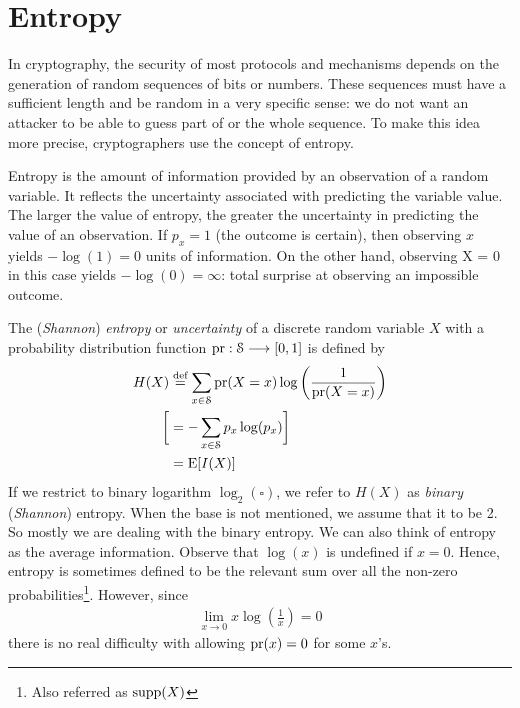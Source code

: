 \documentclass[a4paper, 12pt]{book} %
\begin{document}
\section{Entropy}

In cryptography, the security of most protocols and mechanisms depends on the generation of random sequences of bits or numbers. These sequences must have a sufficient length and be random in a very specific sense: we do not want an attacker to be able to guess part of or the whole sequence. To make this idea more precise, cryptographers use the concept of entropy.

Entropy is the amount of information provided by an observation of a random variable. It reflects the uncertainty associated with predicting the variable value. The larger the value of entropy, the greater the uncertainty in predicting the value of an observation. If $p_x = 1$ (the outcome is certain), then observing $x$ yields $-\log(1) = 0$ units of information. On the other hand, observing X = 0 in this case yields $-\log(0) = \infty$: total surprise at observing an impossible outcome.

\begin{definition}
    The (\emph{Shannon}) \emph{entropy} or \emph{uncertainty} of a discrete random variable $X$ with a probability distribution function $\operatorname{pr}: \EuScript{S} \longrightarrow [0,1]$ is defined by
    \begin{align}
        H(X) &\overset{\text{def}}{=} \sum_{x \in \EuScript{S}} \operatorname{pr}(X = x) \log\left( \frac{1}{\operatorname{pr}(X = x)} \right)  \\
        \bigg[&= - \sum_{x \in \EuScript{S}} p_x \log(p_x) \bigg]\\
        &= \mathrm{E}[I(X)] 
    \end{align}
    If we restrict to binary logarithm $\log_2(\square)$, we refer to $H(X)$ as \emph{binary} (\emph{Shannon}) entropy. When the base is not mentioned, we assume that it to be 2. So mostly we are dealing with the binary entropy. We can also think of entropy as the average information. Observe that $\log(x)$ is undefined if $x = 0$. Hence, entropy is sometimes defined to be the relevant sum over all the non-zero probabilities\footnote{Also referred as $\operatorname{supp}(X)$}. However, since
        \begin{align}
        \lim_{x \longrightarrow 0} x \log\left( \frac{1}{x} \right) = 0
    \end{align}
    there is no real difficulty with allowing $\operatorname{pr}(x) = 0$ for some $x$'s. 
\end{definition}
\end{document}
